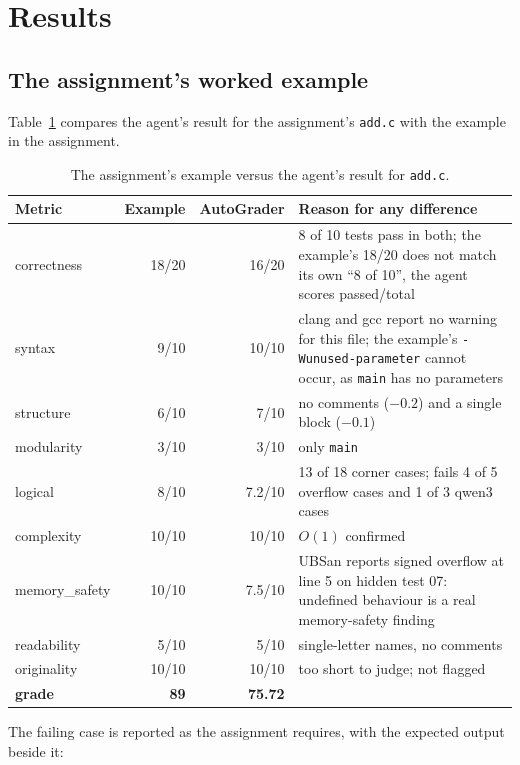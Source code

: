 \documentclass[11pt,a4paper]{article}
\newcommand{\file}[1]{\nolinkurl{#1}}
\begin{document}
\section{Results}
\subsection{The assignment's worked example}
Table~\ref{tab:example} compares the agent's result for the assignment's \file{add.c} with the example in the
assignment.

\begin{table}[htbp]
\centering
\small
\begin{tabular}{@{}lrrp{7.6cm}@{}}
\toprule
\textbf{Metric} & \textbf{Example} & \textbf{AutoGrader} & \textbf{Reason for any difference} \\
\midrule
correctness & 18/20 & 16/20 & 8 of 10 tests pass in both; the example's 18/20 does not match its own ``8 of 10'', the agent scores passed/total \\
syntax & 9/10 & 10/10 & clang and gcc report no warning for this file; the example's \texttt{-Wunused-parameter} cannot occur, as \texttt{main} has no parameters \\
structure & 6/10 & 7/10 & no comments ($-0.2$) and a single block ($-0.1$) \\
modularity & 3/10 & 3/10 & only \texttt{main} \\
logical & 8/10 & 7.2/10 & 13 of 18 corner cases; fails 4 of 5 overflow cases and 1 of 3 qwen3 cases \\
complexity & 10/10 & 10/10 & $O(1)$ confirmed \\
memory\_safety & 10/10 & 7.5/10 & UBSan reports signed overflow at line 5 on hidden test 07: undefined behaviour is a real memory-safety finding \\
readability & 5/10 & 5/10 & single-letter names, no comments \\
originality & 10/10 & 10/10 & too short to judge; not flagged \\
\midrule
\textbf{grade} & \textbf{89} & \textbf{75.72} & \\
\bottomrule
\end{tabular}
\caption{The assignment's example versus the agent's result for \file{add.c}.}
\label{tab:example}
\end{table}

The failing case is reported as the assignment requires, with the expected output beside it:
\end{document}
